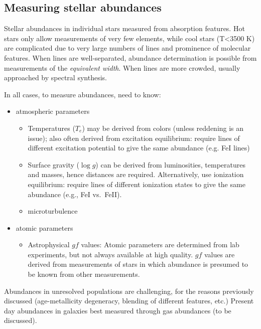 \documentclass{article}
\begin{document}
\subsection{Measuring stellar abundances}
Stellar abundances in individual stars measured from absorption features.
Hot stars only allow measurements of very few elements, while cool stars
(T\textless3500 K) are complicated due to very large numbers of lines and
prominence of molecular features. When lines are well-separated, abundance
determination is possible from measurements of the \textit{equivalent width}.
When lines are more crowded, usually approached by spectral synthesis.

In all cases, to measure abundances, need to know:
\begin{itemize}
    \item atmospheric parameters
        \begin{itemize}
            \item Temperatures ($T_{e}$) may be derived from colors
                (unless reddening is an issue); also often derived from
                excitation equilibrium: require lines of different
                excitation potential to give the same abundance (e.g. FeI lines)
            \item Surface gravity ($\log{g}$) can be derived from luminosities,
                temperatures and masses, hence distances are required.
                Alternatively, use ionization equilibrium: require lines
                of different ionization states to give the same abundance
                (e.g., FeI vs.\ FeII).
            \item microturbulence
        \end{itemize}
    \item atomic parameters
        \begin{itemize}
            \item Astrophysical $gf$ values: Atomic parameters are determined
                from lab experiments, but not always available at high quality.
                $gf$ values are derived from measurements of stars in which
                abundance is presumed to be known from other measurements.
        \end{itemize}
\end{itemize}
Abundances in unresolved populations are challenging, for the reasons
previously discussed (age-metallicity degeneracy, blending of different
features, etc.) Present day abundances in galaxies best measured through
gas abundances (to be discussed).
\end{document}
